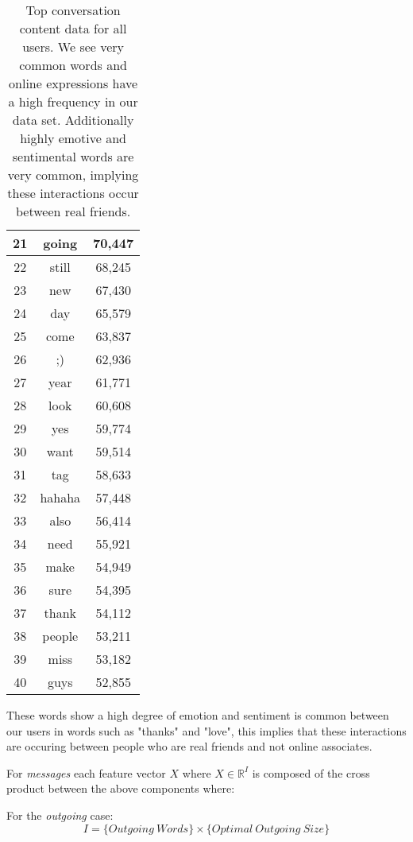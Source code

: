 \begin{table}[!htbp]
\begin{minipage}[b]{.5\textwidth}
\centering
\begin{tabular}{|c|c|c|} %
		\hline
		21 & going & 70,447 \\ \hline
		22 & still & 68,245 \\ \hline
		23 & new & 67,430 \\ \hline
		24 & day & 65,579 \\ \hline
		25 & come & 63,837 \\ \hline
		26 & ;) & 62,936 \\ \hline
		27 & year & 61,771 \\ \hline
		28 & look & 60,608 \\ \hline
		29 & yes & 59,774 \\ \hline
		30 & want & 59,514 \\ \hline
		31 & tag & 58,633 \\ \hline
		32 & hahaha & 57,448 \\ \hline
		33 & also & 56,414 \\ \hline
		34 & need & 55,921 \\ \hline
		35 & make & 54,949 \\ \hline
		36 & sure & 54,395 \\ \hline
		37 & thank & 54,112 \\ \hline
		38 & people & 53,211 \\ \hline
		39 & miss & 53,182 \\ \hline
		40 & guys & 52,855 \\ \hline
	\end{tabular}
\end{minipage}
	\caption{Top conversation content data for all users. We see very common words and online expressions have a high frequency in
	our data set. Additionally highly emotive and sentimental words are very common, implying these interactions occur between real friends.}
	\label{tab:revpol}
\end{table}

These words show a high degree of emotion and sentiment is common between our users in words such as "thanks" and "love", 
this implies that these interactions are occuring between people who are real friends and not online associates.

For \emph{messages} each feature vector $X$ where $X \in \mathbb{R}^I$ is composed of the cross product between the above components where:

For the \emph{outgoing} case:
\[ I = \{Outgoing \ Words\} \times \{Optimal \ Outgoing \ Size\} \]

